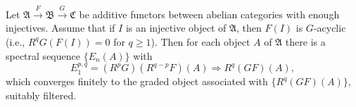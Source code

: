 Let $\mathfrak{A} \xrightarrow{F} \mathfrak{B} \xrightarrow{G} \mathfrak{C}$ be additive functors between abelian categories with enough injectives. Assume that if $I$ is an injective object of $\mathfrak{A}$, then $F(I)$ is $G$-acyclic (i.e., $R^q G(F(I)) = 0$ for $q \geq 1$). Then for each object $A$ of $\mathfrak{A}$ there is a spectral sequence $\{E_n(A)\}$ with
$$E_1^{p,q} = (R^p G)(R^{q-p} F)(A) \Rightarrow R^q(GF)(A),$$
which converges finitely to the graded object associated with $\{R^q(GF)(A)\}$, suitably filtered.